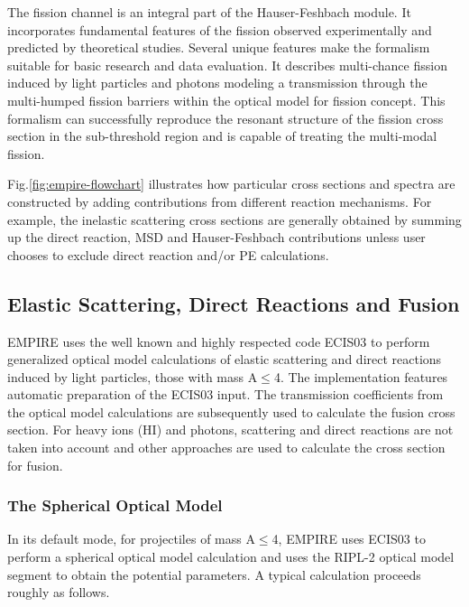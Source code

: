 \documentclass[twocolumn,amsmath,amssymb,10pt,groupedaddress,a4paper]{revtex4}
\begin{document}
The fission channel is an integral part of the Hauser-Feshbach module. It incorporates
fundamental features of the fission observed experimentally and predicted by theoretical studies. Several unique features make the formalism suitable for basic research and data evaluation.  It describes multi-chance  fission induced by light particles and photons modeling a transmission through the multi-humped fission barriers within the optical model for fission concept. This formalism can successfully reproduce the resonant structure of the fission cross section in the sub-threshold region and is capable of treating the multi-modal fission.

Fig.\ref{fig:empire-flowchart} illustrates how particular cross sections and spectra are constructed by adding contributions from different reaction mechanisms. For example, the inelastic scattering cross sections are generally obtained by summing up the direct reaction, MSD and Hauser-Feshbach contributions unless user chooses to exclude direct reaction and/or PE calculations.


\subsection{Elastic Scattering, Direct Reactions and Fusion}


EMPIRE uses the well known and highly respected code ECIS03 \cite{ECIS}
to perform generalized optical model calculations of elastic scattering and
direct reactions induced by light particles, those with mass A$\leq$4.
 The implementation features automatic preparation of
the ECIS03 input. The transmission coefficients from the optical model
calculations are subsequently used to calculate the fusion cross section. For heavy
ions (HI) and photons, scattering and direct reactions are not taken into
account and other approaches are used to calculate the cross section
for fusion.

\subsubsection{The Spherical Optical Model\label{sec:sph-opt}}

In its default mode, for projectiles of mass A$\leq$4,
 EMPIRE uses ECIS03 to perform a spherical optical
model calculation and uses the RIPL-2 \cite{RIPL2} optical
model segment to obtain the potential parameters. A typical calculation proceeds
roughly as follows.
\end{document}
